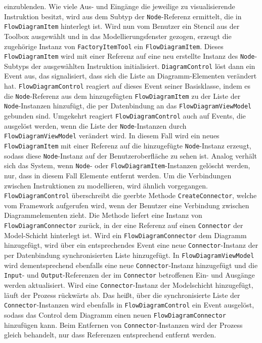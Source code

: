 einzublenden. Wie viele Aus- und Eingänge die jeweilige zu visualisierende Instruktion besitzt, wird aus dem Subtyp der \texttt{Node}-Referenz ermittelt, die in \texttt{FlowDiagramItem} hinterlegt ist.
\newline
Wird nun vom Benutzer ein Stencil aus der Toolbox ausgewählt und in das Modellierungsfenster gezogen, erzeugt die zugehörige Instanz von \texttt{FactoryItemTool} ein \texttt{FlowDiagramItem}. Dieses \texttt{FlowDiagramItem} wird mit einer Referenz auf eine neu erstellte Instanz des \texttt{Node}-Subtyps der ausgewählten Instruktion initialisiert. \texttt{DiagramControl} löst dann ein Event aus, das signalisiert, dass sich die Liste an Diagramm-Elementen verändert hat. \texttt{FlowDiagramControl} reagiert auf dieses Event seiner Basisklasse, indem es die \texttt{Node}-Referenz aus dem hinzugefügten \texttt{FlowDiagramItem} zu der Liste der \texttt{Node}-Instanzen hinzufügt, die per Datenbindung an das \texttt{FlowDiagramViewModel} gebunden sind. Umgekehrt reagiert \texttt{FlowDiagramControl} auch auf Events, die ausgelöst werden, wenn die Liste der \texttt{Node}-Instanzen durch \texttt{FlowDiagramViewModel} verändert wird. In diesem Fall wird ein neues \texttt{FlowDiagramItem} mit einer Referenz auf die hinzugefügte \texttt{Node}-Instanz erzeugt, sodass diese \texttt{Node}-Instanz auf der Benutzeroberfläche zu sehen ist. Analog verhält sich das System, wenn \texttt{Node}- oder \texttt{FlowDiagramItem}-Instanzen gelöscht werden, nur, dass in diesem Fall Elemente entfernt werden.
\newline
Um die Verbindungen zwischen Instruktionen zu modellieren, wird ähnlich vorgegangen. \texttt{FlowDiagramControl} überschreibt die geerbte Methode \texttt{CreateConnector}, welche vom Framework aufgerufen wird, wenn der Benutzer eine Verbindung zwischen Diagrammelementen zieht. Die Methode liefert eine Instanz von \texttt{Flow\-Dia\-gram\-Con\-nec\-tor} zurück, in der eine Referenz auf einen \texttt{Connector} der Model-Schicht hinterlegt ist. Wird ein \texttt{FlowDiagramConnector} dem Diagramm hinzugefügt, wird über ein entsprechendes Event eine neue \texttt{Connector}-Instanz der per Datenbindung synchronisierten Liste hinzugefügt. In \texttt{FlowDiagramViewModel} wird dementsprechend ebenfalls eine neue \texttt{Connector}-Instanz hinzugefügt und die \texttt{Input}- und \texttt{Output}-Referenzen der im \texttt{Connector} betroffenen Ein- und Ausgänge werden aktualisiert. Wird eine \texttt{Connector}-Instanz der Modelschicht hinzugefügt, läuft der Prozess rückwärts ab. Das heißt, über die synchronisierte Liste der \texttt{Connector}-Instanzen wird ebenfalls in \texttt{FlowDiagramControl} ein Event ausgelöst, sodass das Control dem Diagramm einen neuen \texttt{Flow\-Dia\-gram\-Co\-nnec\-tor} hinzufügen kann. Beim Entfernen von \texttt{Connector}-Instanzen wird der Prozess gleich behandelt, nur dass Referenzen entsprechend entfernt werden.      

